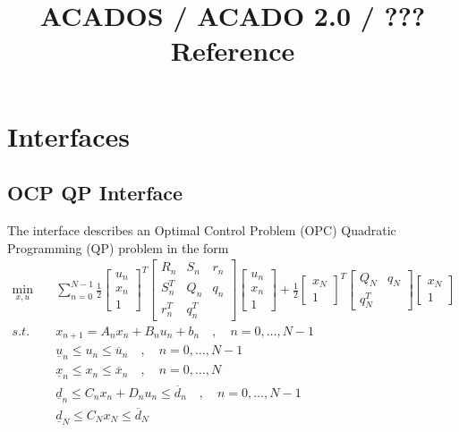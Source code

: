 \documentclass{report}
\title{ACADOS / ACADO 2.0 / ??? \\ Reference}
\begin{document}
\maketitle

\chapter{Interfaces}

\section{OCP QP Interface}

The interface describes an Optimal Control Problem (OPC) Quadratic Programming (QP) problem in the form
\begin{align}
\min_{x,u} & \quad \sum_{n=0}^{N-1} \frac 1 2 \begin{bmatrix} u_n \\ x_n \\ 1 \end{bmatrix}^T \begin{bmatrix} R_n & S_n & r_n \\ S_n^T & Q_n & q_n \\ r_n^T & q_n^T & \end{bmatrix} \begin{bmatrix} u_n \\ x_n \\ 1 \end{bmatrix} + \frac 1 2 \begin{bmatrix} x_N \\ 1 \end{bmatrix}^T \begin{bmatrix} Q_N & q_N \\ q_N^T & \end{bmatrix} \begin{bmatrix} x_N \\ 1 \end{bmatrix} \\
s.t. & \quad x_{n+1} = A_n x_n + B_n u_n + b_n \quad , \quad n=0,\dots,N-1 \\
& \quad \underline u_n \leq u_n \leq \overline u_n \quad , \quad n=0,\dots,N-1 \\
& \quad \underline x_n \leq x_n \leq \overline x_n \quad , \quad n=0,\dots,N \\
& \quad \underline d_n \leq C_n x_n + D_n u_n \leq \overline d_n \quad , \quad n=0,\dots,N-1 \\
& \quad \underline d_N \leq C_N x_N \leq \overline d_N 
\end{align}
\end{document}
